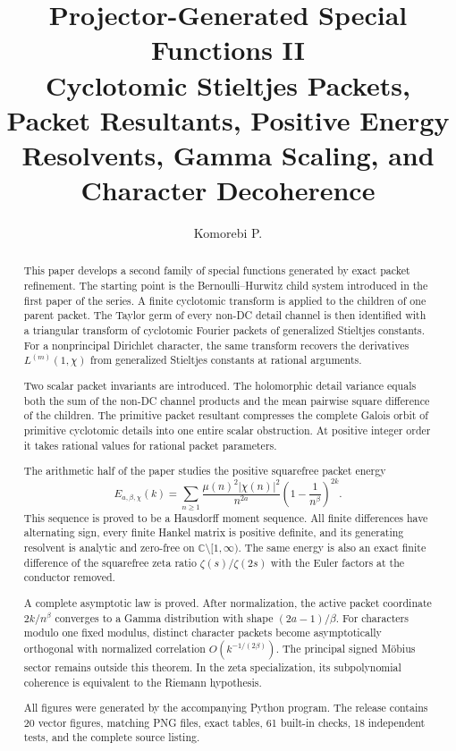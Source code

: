\documentclass[11pt,openany]{report}
\title{\textbf{Projector-Generated Special Functions II}\\[0.25em]
\Large Cyclotomic Stieltjes Packets, Packet Resultants, Positive Energy Resolvents, Gamma Scaling, and Character Decoherence}
\author{Komorebi P.}
\date{}
\theoremstyle{definition}
\theoremstyle{remark}
\newcommand{\C}{\mathbb C}
\newcommand{\abs}[1]{\left\lvert#1\right\rvert}
\begin{document}
\maketitle

\begin{abstract}
This paper develops a second family of special functions generated by exact packet refinement. The starting point is the Bernoulli--Hurwitz child system introduced in the first paper of the series. A finite cyclotomic transform is applied to the children of one parent packet. The Taylor germ of every non-DC detail channel is then identified with a triangular transform of cyclotomic Fourier packets of generalized Stieltjes constants. For a nonprincipal Dirichlet character, the same transform recovers the derivatives $L^{(m)}(1,\chi)$ from generalized Stieltjes constants at rational arguments.

Two scalar packet invariants are introduced. The holomorphic detail variance equals both the sum of the non-DC channel products and the mean pairwise square difference of the children. The primitive packet resultant compresses the complete Galois orbit of primitive cyclotomic details into one entire scalar obstruction. At positive integer order it takes rational values for rational packet parameters.

The arithmetic half of the paper studies the positive squarefree packet energy
\[
E_{a,\beta,\chi}(k)
=
\sum_{n\ge1}
\frac{\mu(n)^2\abs{\chi(n)}^2}{n^{2a}}
\left(1-\frac1{n^\beta}\right)^{2k}.
\]
This sequence is proved to be a Hausdorff moment sequence. All finite differences have alternating sign, every finite Hankel matrix is positive definite, and its generating resolvent is analytic and zero-free on $\C\setminus[1,\infty)$. The same energy is also an exact finite difference of the squarefree zeta ratio $\zeta(s)/\zeta(2s)$ with the Euler factors at the conductor removed.

A complete asymptotic law is proved. After normalization, the active packet coordinate $2k/n^\beta$ converges to a Gamma distribution with shape $(2a-1)/\beta$. For characters modulo one fixed modulus, distinct character packets become asymptotically orthogonal with normalized correlation $O(k^{-1/(2\beta)})$. The principal signed M\"obius sector remains outside this theorem. In the zeta specialization, its subpolynomial coherence is equivalent to the Riemann hypothesis.

All figures were generated by the accompanying Python program. The release contains 20 vector figures, matching PNG files, exact tables, 61 built-in checks, 18 independent tests, and the complete source listing.
\end{abstract}
\end{document}
